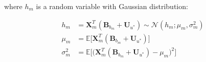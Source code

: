 \noindent where $h_{m}$ is a random variable with Gaussian distribution:

\begin{align*}
 h_{m}  & =\bm{X}_m^T(\bm{B}_{b_m}+\bm{U}_{u^*})  \sim \mathcal{N}(h_{m};\mu_{m},\sigma^2_{m}) \\ 
\mu_{m} & =\mathbb{E}\big[\bm{X}_m^T(\bm{B}_{b_m}+\bm{U}_{u^*})\big] \\ 
\sigma^2_{m} & =\mathbb{E}\Big[\big(\bm{X}_m^T(\bm{B}_{b_m}+\bm{U}_{u^*})-\mu_{m}\big)^2\Big]
\end{align*}
